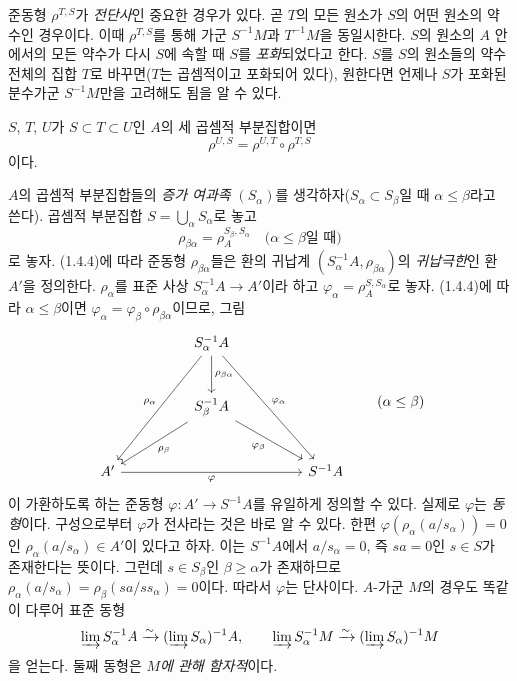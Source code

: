 \begin{env}[1.4.3]
\label{0.1.4.3-ko}
준동형 $\rho^{T,S}$가 \emph{전단사}인 중요한 경우가 있다. 곧 $T$의 모든 원소가 $S$의 어떤 원소의 약수인 경우이다. 이때 $\rho^{T,S}$를 통해 가군 $S^{-1}M$과 $T^{-1}M$을 동일시한다.
$S$의 원소의 $A$ 안에서의 모든 약수가 다시 $S$에 속할 때 $S$를 \emph{포화}되었다고 한다. $S$를 $S$의 원소들의 약수 전체의 집합 $T$로 바꾸면($T$는 곱셈적이고 포화되어 있다), 원한다면 언제나 $S$가 포화된 분수가군 $S^{-1}M$만을 고려해도 됨을 알 수 있다.
\end{env}

\begin{env}[1.4.4]
\label{0.1.4.4-ko}
$S$, $T$, $U$가 $S\subset T\subset U$인 $A$의 세 곱셈적 부분집합이면
\[
  \rho^{U,S}=\rho^{U,T}\circ\rho^{T,S}
\]
이다.
\end{env}

\begin{env}[1.4.5]
\label{0.1.4.5-ko}
$A$의 곱셈적 부분집합들의 \emph{증가 여과족} $(S_\alpha)$를 생각하자($S_\alpha\subset S_\beta$일 때 $\alpha\leq\beta$라고 쓴다). 곱셈적 부분집합 $S=\bigcup_\alpha S_\alpha$로 놓고
\[
  \rho_{\beta\alpha}=\rho_A^{S_\beta,S_\alpha}\quad\text{($\alpha\leq\beta$일 때)}
\]
로 놓자.
(1.4.4)에 따라 준동형 $\rho_{\beta\alpha}$들은 환의 귀납계 $(S_\alpha^{-1}A,\rho_{\beta\alpha})$의 \emph{귀납극한}인 환 $A'$을 정의한다.
$\rho_\alpha$를 표준 사상 $S_\alpha^{-1}A\to A'$이라 하고 $\varphi_\alpha=\rho_A^{S,S_\alpha}$로 놓자. (1.4.4)에 따라 $\alpha\leq\beta$이면 $\varphi_\alpha=\varphi_\beta\circ\rho_{\beta\alpha}$이므로, 그림
\[
\begin{tikzcd}[column sep=huge,row sep=large]
  & S_\alpha^{-1}A
      \arrow[ddl,"\rho_\alpha"']
      \arrow[d,"\rho_{\beta\alpha}"]
      \arrow[ddr,"\varphi_\alpha"] & \\
  & S_\beta^{-1}A
      \arrow[dl,"\rho_\beta"]
      \arrow[dr,"\varphi_\beta"'] & \\
A' \arrow[rr,"\varphi"'] & & S^{-1}A
\end{tikzcd}
\qquad(\alpha\leq\beta)
\]
이 가환하도록 하는 준동형 $\varphi:A'\to S^{-1}A$를 유일하게 정의할 수 있다.
실제로 $\varphi$는 \emph{동형}이다. 구성으로부터 $\varphi$가 전사라는 것은 바로 알 수 있다.
한편 $\varphi(\rho_\alpha(a/s_\alpha))=0$인 $\rho_\alpha(a/s_\alpha)\in A'$이 있다고 하자. 이는 $S^{-1}A$에서 $a/s_\alpha=0$, 즉 $sa=0$인 $s\in S$가 존재한다는 뜻이다. 그런데 $s\in S_\beta$인 $\beta\geq\alpha$가 존재하므로 $\rho_\alpha(a/s_\alpha)=\rho_\beta(sa/ss_\alpha)=0$이다. 따라서 $\varphi$는 단사이다.
$A$-가군 $M$의 경우도 똑같이 다루어 표준 동형
\[
  \varinjlim S_\alpha^{-1}A\xrightarrow{\sim}
  (\varinjlim S_\alpha)^{-1}A,
  \qquad
  \varinjlim S_\alpha^{-1}M\xrightarrow{\sim}
  (\varinjlim S_\alpha)^{-1}M
\]
을 얻는다. 둘째 동형은 \emph{$M$에 관해 함자적}이다.
\end{env}

